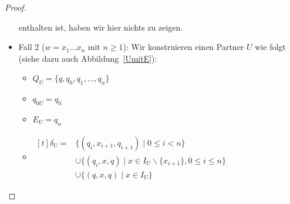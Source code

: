 \begin{proof}
\begin{itemize}
      enthalten ist, haben wir hier nichts zu zeigen.
    \item Fall 2 ($w=x_1\dots x_n$ mit $n\geq 1$): Wir konstruieren einen
      Partner $U$ wie folgt (siehe dazu auch Abbildung~\ref{UmitE}):
      \begin{itemize}
        \item $Q_U=\{q,q_0,q_1,\dots ,q_n\}$
        \item $q_{0U}=q_0$
        \item $E_U={q_n}$
        \item $\begin{aligned}[t]
            \delta _U=&\{(q_i,x_{i+1},q_{i+1})\mid 0\leq i< n\}\\
                      &\cup\{(q_i,x,q)\mid x\in I_U\backslash\{x_{i+1}\},0\leq
          i\leq n\}\\
          &\cup\{(q,x,q)\mid x\in I_U\}
              \end{aligned}$
      \end{itemize}
      \begin{figure} [h!tbp]
      \begin{center}
\end{center}
\end{figure}
\end{itemize}
\end{proof}
